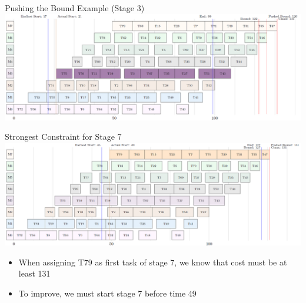 \begin{frame}{Pushing the Bound Example (Stage 3)}
\includegraphics[width=14cm]{images/flowbound122pushed.PNG}
\end{frame}


\begin{frame}{Strongest Constraint for Stage 7}
\includegraphics[width=14cm]{images/flowbound127pushed.PNG}
\begin{itemize}
    \item When assigning T79 as first task of stage 7, we know that cost must be at least 131
    \item To improve, we must start stage 7 before time 49
\end{itemize}
\end{frame}


